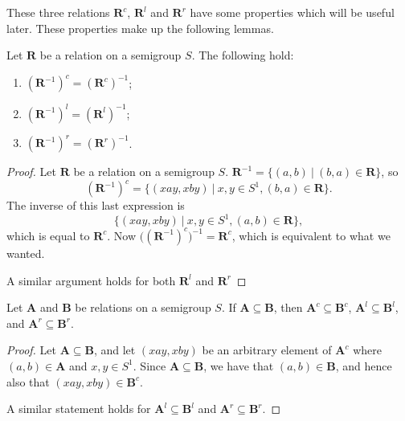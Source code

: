 These three relations $\mathbf{R}^c$, $\mathbf{R}^l$ and $\mathbf{R}^r$ have
some properties which will be useful later.  These properties make up the
following lemmas.

\begin{lemma}
  \label{lem:cinverse}
  Let $\mathbf{R}$ be a relation on a semigroup $S$.
  The following hold:
  \begin{enumerate}[\rm(i)]
  \item $(\mathbf{R}^{-1})^c = (\mathbf{R}^c)^{-1}$;
  \item $(\mathbf{R}^{-1})^l = (\mathbf{R}^l)^{-1}$;
  \item $(\mathbf{R}^{-1})^r = (\mathbf{R}^r)^{-1}$.
  \end{enumerate}
  \begin{proof}
    Let $\mathbf{R}$ be a relation on a semigroup $S$.
    $\mathbf{R}^{-1} = \{(a,b)~|~(b,a)\in\mathbf{R}\}$, so
    $$(\mathbf{R}^{-1})^c = \{(xay,xby)~|~x,y \in S^1, (b,a)\in\mathbf{R}\}.$$
    The inverse of this last expression is
    $$\{(xay,xby)~|~x,y \in S^1, (a,b)\in\mathbf{R}\},$$
    which is equal to $\mathbf{R}^c$.
    Now $\big((\mathbf{R}^{-1})^c\big)^{-1} = \mathbf{R}^c$, which is equivalent
    to what we wanted.

    A similar argument holds for both $\mathbf{R}^l$ and $\mathbf{R}^r$
  \end{proof}
\end{lemma}

\begin{lemma}
  \label{lem:csubset}
  Let $\mathbf{A}$ and $\mathbf{B}$ be relations on a semigroup $S$.  If
  $\mathbf{A} \subseteq \mathbf{B}$, then $\mathbf{A}^c \subseteq \mathbf{B}^c$,
  $\mathbf{A}^l \subseteq \mathbf{B}^l$, and
  $\mathbf{A}^r \subseteq \mathbf{B}^r$.
  \begin{proof}
    Let $\mathbf{A} \subseteq \mathbf{B}$, and let $(xay,xby)$ be an arbitrary
    element of $\mathbf{A}^c$ where $(a,b) \in \mathbf{A}$ and $x,y \in S^1$.
    Since $\mathbf{A} \subseteq \mathbf{B}$, we have that $(a,b) \in
    \mathbf{B}$, and hence also that $(xay,xby) \in \mathbf{B}^c$.

    A similar statement holds for $\mathbf{A}^l \subseteq \mathbf{B}^l$ and
    $\mathbf{A}^r \subseteq \mathbf{B}^r$.
  \end{proof}
\end{lemma}

